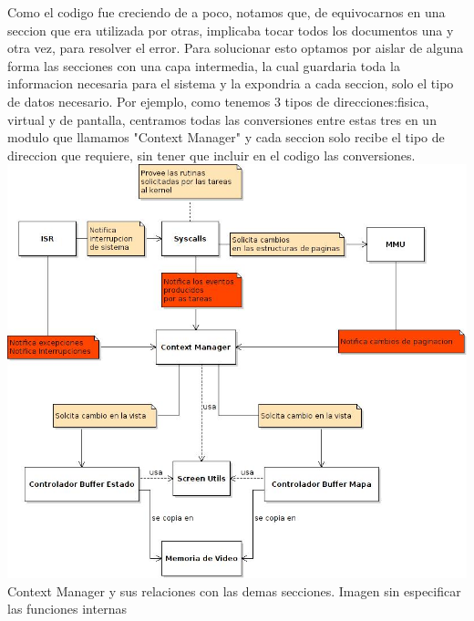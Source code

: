 Como el codigo fue creciendo de a poco, notamos que, de equivocarnos en una seccion que era utilizada por otras, implicaba tocar todos los documentos una y otra vez, para resolver el error. Para solucionar esto optamos por aislar de alguna forma las secciones con una capa intermedia, la cual guardaria toda la informacion necesaria para el sistema y la expondria a cada seccion, solo el tipo de datos necesario. Por ejemplo, como tenemos 3 tipos de direcciones:fisica, virtual y de pantalla, centramos todas las conversiones entre estas tres en un modulo que llamamos "Context Manager" y cada seccion solo recibe el tipo de direccion que requiere, sin tener que incluir en el codigo las conversiones.\\

\includegraphics[scale=0.5]{diagramas/contextManager-relaciones.jpg}   
\\Context Manager y sus relaciones con las demas secciones. Imagen sin especificar las funciones internas\\

